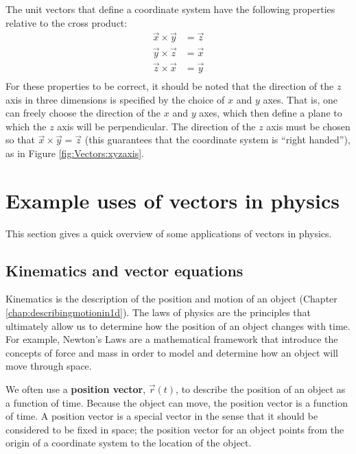 The unit vectors that define a coordinate system have the following properties relative to the cross product:
\begin{align*}
\vec x \times \vec y &= \vec z\\
\vec y \times \vec z &= \vec x\\
\vec z \times \vec x &= \vec y\\
\end{align*}
For these properties to be correct, it should be noted that the direction of the $z$ axis in three dimensions is specified by the choice of $x$ and $y$ axes. That is, one can freely choose the direction of the $x$ and $y$ axes, which then define a plane to which the $z$ axis will be perpendicular. The direction of the $z$ axis must be chosen so that $\vec x \times \vec y = \vec z$ (this guarantees that the coordinate system is ``right handed''), as in Figure \ref{fig:Vectors:xyzaxis}.

\section{Example uses of vectors in physics}
This section gives a quick overview of some applications of vectors in physics.
\subsection{Kinematics and vector equations}
Kinematics is the description of the position and motion of an object (Chapter \ref{chap:describingmotionin1d}). The laws of physics are the principles that ultimately allow us to determine how the position of an object changes with time. For example, Newton's Laws are a mathematical framework that introduce the concepts of force and mass in order to model and determine how an object will move through space.

We often use a \textbf{position vector}, $\vec r(t)$, to describe the position of an object as a function of time. Because the object can move, the position vector is a function of time. A position vector is a special vector in the sense that it should be considered to be fixed in space; the position vector for an object points from the origin of a coordinate system to the location of the object. 

